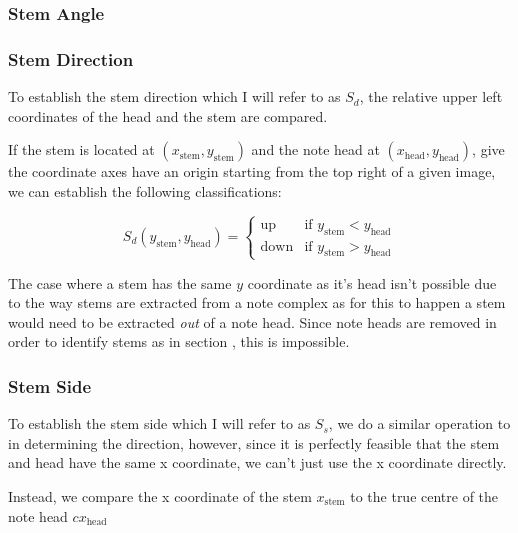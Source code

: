 

\subsubsection{Stem Angle}


\subsubsection{Stem Direction}

To establish the stem direction which I will refer to as $S_d$, the relative upper left coordinates of the head and the stem are compared.

If the stem is located at $(x_{\text{stem}}, y_{\text{stem}})$ and the note head at $(x_{\text{head}}, y_{\text{head}})$, give the coordinate axes have an origin starting from the top right of a given image, we can establish the following classifications:

$$
S_{d} (y_{\text{stem}}, y_{\text{head}}) =
\left\{
	\begin{array}{ll}
		\text{up}   & \mbox{if } y_{\text{stem}} < y_{\text{head}} \\
		\text{down} & \mbox{if } y_{\text{stem}} > y_{\text{head}}
	\end{array}
\right.
$$

The case where a stem has the same $y$ coordinate as it's head isn't possible due to the way stems are extracted from a note complex as for this to happen a stem would need to be extracted \emph{out} of a note head. Since note heads are removed in order to identify stems as in section , this is impossible.

\subsubsection{Stem Side}
To establish the stem side which I will refer to as $S_s$, we do a similar operation to in determining the direction, however, since it is perfectly feasible that the stem and head have the same x coordinate, we can't just use the x coordinate directly.

Instead, we compare the x coordinate of the stem $x_{\text{stem}}$ to the true centre  of the note head $cx_{\text{head}}$

